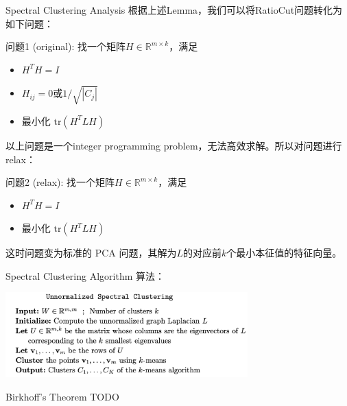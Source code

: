 \begin{frame}{Spectral Clustering Analysis}
    根据上述Lemma，我们可以将RatioCut问题转化为如下问题：

    问题1 (original): 找一个矩阵$H \in \mathbb{R}^{m\times k}$，满足
    \begin{itemize}
        \item $H^{T}H = I$
        \item $H_{ij}=0$或$1/\sqrt{|C_j|}$
        \item 最小化 $\text{tr}(H^{T}LH)$
    \end{itemize}

    以上问题是一个integer programming problem，无法高效求解。所以对问题进行relax：

    问题2 (relax): 找一个矩阵$H \in \mathbb{R}^{m\times k}$，满足
    \begin{itemize}
        \item $H^{T}H = I$
        \item 最小化 $\text{tr}(H^{T}LH)$
    \end{itemize}
    这时问题变为标准的 PCA 问题，其解为$L$的对应前$k$个最小本征值的特征向量。
\end{frame}

\begin{frame}{Spectral Clustering Algorithm}
    算法：
    \begin{center}
        \includegraphics[width=0.7\textwidth]{assets/usc.png}
    \end{center}
\end{frame}

\begin{frame}{Birkhoff's Theorem}
    TODO
\end{frame}
